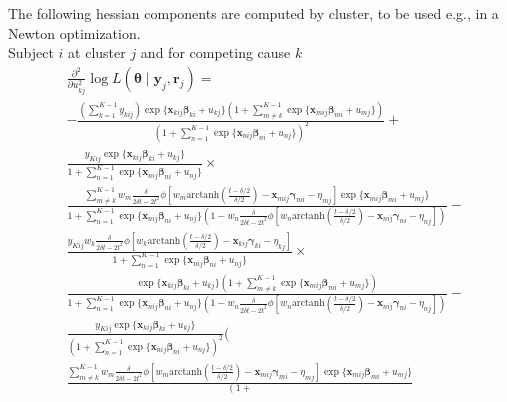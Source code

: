 \documentclass[12pt, %
               openright, %
               oneside, %
               a4paper, %
               chapter=TITLE, %
               section=TITLE, %
               brazil,
               english %
]{abntex2}
\begin{document}
\begin{apendicesenv}
The following hessian components are computed by cluster, to be used
e.g., in a Newton optimization.\\
\indent
Subject \(i\) at cluster \(j\) and for competing cause \(k\)
\begin{align*}
  &\frac{\partial^{2}}{\partial u_{kj}^{2}}
    \log L(\bm{\theta}\mid\bm{y}_{j}, \bm{r}_{j}) =\\
  &-\frac{\left(\sum_{k = 1}^{K-1} y_{kij}\right)
    \exp\{\bm{x}_{kij}\bm{\beta}_{ki} + u_{kj}\}
    \left(1 +
    \sum_{m \neq k}^{K-1}\exp\{\bm{x}_{mij}\bm{\beta}_{mi} + u_{mj}\}
    \right)}{\left(1 +
    \sum_{n = 1}^{K-1}\exp\{\bm{x}_{nij}\bm{\beta}_{ni} + u_{nj}\}
    \right)^{2}} +\\
  &\frac{y_{Kij}
    \exp\{\bm{x}_{kij} \bm{\beta}_{ki} + u_{kj}\}}{
    1 + \sum_{n = 1}^{K-1}\exp\{\bm{x}_{nij} \bm{\beta}_{ni} + u_{nj}\}
    }\times\\
  &\frac{
    \sum_{m \neq k}^{K-1}w_{m}\frac{\delta}{2\delta t - 2t^{2}}
    \phi[w_{m}\text{arctanh}\left(\frac{t-\delta/2}{\delta/2}\right)
    - \bm{x}_{mij}\bm{\gamma}_{mi} - \eta_{mj}]
    \exp\{\bm{x}_{mij}\bm{\beta}_{mi} + u_{mj}\}}{1 +
    \sum_{n = 1}^{K-1}\exp\{\bm{x}_{nij}\bm{\beta}_{ni} + u_{nj}\}
    (1 - w_{n}\frac{\delta}{2\delta t - 2t^{2}}
    \phi[w_{n}\text{arctanh}\left(\frac{t-\delta/2}{\delta/2}\right)
    - \bm{x}_{nij}\bm{\gamma}_{ni} - \eta_{nj}])} -\\
  &\frac{
    y_{Kij}
    w_{k}\frac{\delta}{2\delta t - 2t^{2}}
    \phi[w_{k}\text{arctanh}\left(\frac{t-\delta/2}{\delta/2}\right)
    - \bm{x}_{kij}\bm{\gamma}_{ki} - \eta_{kj}] }{1 +
    \sum_{n = 1}^{K-1}\exp\{\bm{x}_{nij}\bm{\beta}_{ni} + u_{nj}\}
    }\times\\
  &\frac{\exp\{\bm{x}_{kij}\bm{\beta}_{ki} + u_{kj}\}
    \left(1 +
    \sum_{m \neq k}^{K-1}\exp\{\bm{x}_{mij}\bm{\beta}_{mi} + u_{mj}\}
    \right)}{1 +
    \sum_{n = 1}^{K-1}\exp\{\bm{x}_{nij}\bm{\beta}_{ni} + u_{nj}\}
    (1 - w_{n}\frac{\delta}{2\delta t - 2t^{2}}
    \phi[w_{n}\text{arctanh}\left(\frac{t-\delta/2}{\delta/2}\right)
    - \bm{x}_{nij}\bm{\gamma}_{ni} - \eta_{nj}])} -\\
  &\frac{y_{Kij}\exp\{\bm{x}_{kij}\bm{\beta}_{ki} + u_{kj}\}}{\left(1 +
    \sum_{n = 1}^{K-1}\exp\{\bm{x}_{nij}\bm{\beta}_{ni} + u_{nj}\}
    \right)^{2}}\Bigg(\\
  &\frac{\sum_{m \neq k}^{K-1}
    w_{m}\frac{\delta}{2\delta t - 2t^{2}}
    \phi[w_{m}\text{arctanh}\left(\frac{t-\delta/2}{\delta/2}\right)
    - \bm{x}_{mij}\bm{\gamma}_{mi} - \eta_{mj}]
    \exp\{\bm{x}_{mij}\bm{\beta}_{mi} + u_{mj}\}}{\left(1 +
}
\end{align*}
\end{apendicesenv}
\end{document}
